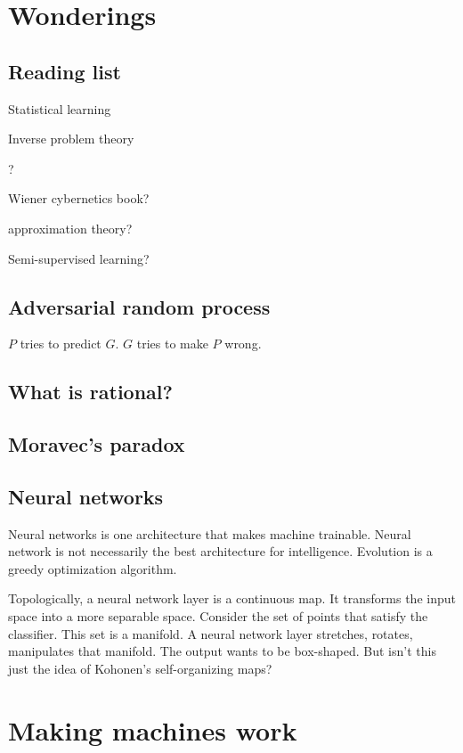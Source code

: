 \chapter{Wonderings}

\section{Reading list}

Statistical learning

Inverse problem theory \cite{tarantola2005inverse}

? \cite{SepLogicAi}

Wiener cybernetics book? \cite{WienerCyber}

approximation theory? \cite{ApproxThePrac}

Semi-supervised learning?

\section{Adversarial random process}

\(P\) tries to predict \(G\).
\(G\) tries to make \(P\) wrong.

\section{What is rational?}

\section{Moravec's paradox}

\section{Neural networks}

Neural networks is one architecture that makes machine trainable.
Neural network is not necessarily the best architecture for intelligence.
Evolution is a greedy optimization algorithm.

Topologically, a neural network layer is a continuous map.
It transforms the input space into a more separable space.
Consider the set of points that satisfy the classifier.
This set is a manifold.
A neural network layer stretches, rotates, manipulates that manifold.
The output wants to be box-shaped.
But isn't this just the idea of Kohonen's self-organizing maps?

\chapter{Making machines work}

